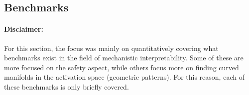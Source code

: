 \documentclass[11pt,a4paper]{article}
\begin{document}
\subsection{Benchmarks}
\paragraph{Disclaimer:} For this section, the focus was mainly on quantitatively covering what benchmarks exist in the field of mechanistic interpretability. Some of these are more focused on the safety aspect, while others focus more on finding curved manifolds in the activation space (geometric patterns). For this reason, each of these benchmarks is only briefly covered.
\end{document}
